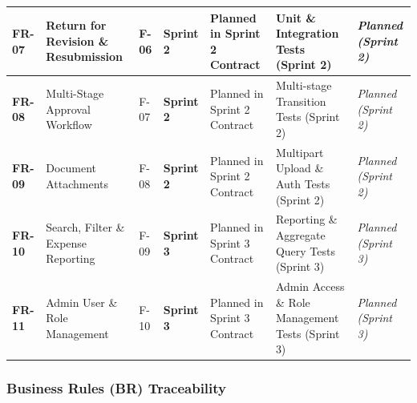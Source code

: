 \documentclass[11pt,a4paper]{article}
\begin{document}
\begin{longtable}{|>{\RaggedRight}p{1.3cm}|>{\RaggedRight}p{2.8cm}|>{\centering\arraybackslash}p{1.3cm}|>{\centering\arraybackslash}p{1.4cm}|>{\RaggedRight}p{2.4cm}|>{\RaggedRight}p{2.6cm}|>{\RaggedRight}p{2.1cm}|}
\textbf{FR-07} & Return for Revision \& Resubmission & F-06 & \textbf{Sprint 2} & Planned in Sprint 2 Contract & Unit \& Integration Tests (Sprint 2) & \textit{Planned (Sprint 2)} \\ \hline
\textbf{FR-08} & Multi-Stage Approval Workflow & F-07 & \textbf{Sprint 2} & Planned in Sprint 2 Contract & Multi-stage Transition Tests (Sprint 2) & \textit{Planned (Sprint 2)} \\ \hline
\textbf{FR-09} & Document Attachments & F-08 & \textbf{Sprint 2} & Planned in Sprint 2 Contract & Multipart Upload \& Auth Tests (Sprint 2) & \textit{Planned (Sprint 2)} \\ \hline
\textbf{FR-10} & Search, Filter \& Expense Reporting & F-09 & \textbf{Sprint 3} & Planned in Sprint 3 Contract & Reporting \& Aggregate Query Tests (Sprint 3) & \textit{Planned (Sprint 3)} \\ \hline
\textbf{FR-11} & Admin User \& Role Management & F-10 & \textbf{Sprint 3} & Planned in Sprint 3 Contract & Admin Access \& Role Management Tests (Sprint 3) & \textit{Planned (Sprint 3)} \\ \hline
\end{longtable}
\vspace{0.3em}



\subsubsection{Business Rules (BR) Traceability}
\end{document}
